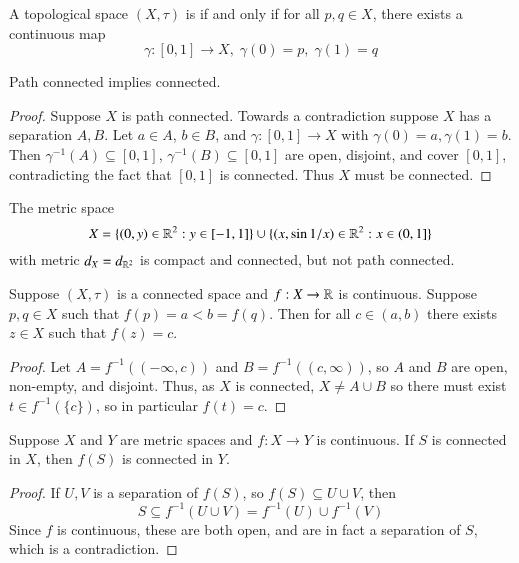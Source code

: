 \begin{defn}
    A topological space $(X,\tau)$ is  if and only if for all $p,q \in X$, there exists a continuous map $$\gamma:[0,1]\rightarrow X,\;\gamma(0) = p,\;\gamma(1) = q$$
\end{defn}

\begin{prop}\label{prop:3.1.7}
    Path connected implies connected.
\end{prop}
\begin{proof}
    Suppose $X$ is path connected. Towards a contradiction suppose $X$ has a separation $A,B$. Let $a \in A$, $b \in B$, and $\gamma:[0,1]\rightarrow X$ with $\gamma(0) = a,\gamma(1) = b$. Then $\gamma^{-1}(A) \subseteq [0,1]$, $\gamma^{-1}(B) \subseteq [0,1]$ are open, disjoint, and cover $[0,1]$, contradicting the fact that $[0,1]$ is connected. Thus $X$ must be connected.
\end{proof}

\begin{eg}
    The metric space \begin{equation*}
        X = \{(0,y) \in\mathbb R^2:y\in[-1,1]\}\cup\{(x,\sin 1/x)\in \mathbb R^2:x \in (0,1]\}
    \end{equation*}
    with metric $d_X = d_{\mathbb R^2}$ is compact and connected, but not path connected.
\end{eg}

\begin{namthm}
    Suppose $(X,\tau)$ is a connected space and $f:X\rightarrow \mathbb R$ is continuous. Suppose $p,q \in X$ such that $f(p) = a < b = f(q)$. Then for all $c \in (a,b)$ there exists $z \in X$ such that $f(z) = c$.
\end{namthm}
\begin{proof}
    Let $A = f^{-1}((-\infty,c))$ and $B = f^{-1}((c,\infty))$, so $A$ and $B$ are open, non-empty, and disjoint. Thus, as $X$ is connected, $X \neq A \cup B$ so there must exist $t \in f^{-1}(\{c\})$, so in particular $f(t) =c$.
\end{proof}

\begin{prop}
    Suppose $X$ and $Y$ are metric spaces and $f:X\rightarrow Y$ is continuous. If $S$ is connected in $X$, then $f(S)$ is connected in $Y$.
\end{prop}
\begin{proof}
    If $U,V$ is a separation of $f(S)$, so $f(S) \subseteq U\cup V$, then $$S \subseteq f^{-1}(U\cup V) = f^{-1}(U)\cup f^{-1}(V)$$ Since $f$ is continuous, these are both open, and are in fact a separation of $S$, which is a contradiction.
\end{proof}



